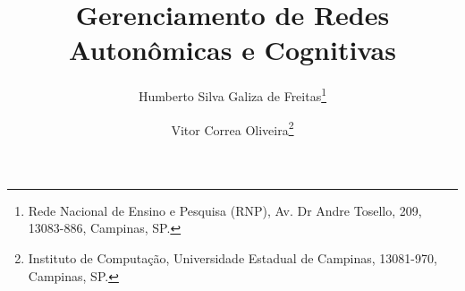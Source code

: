 \documentclass[11pt,twoside]{article}
\begin{document}
% 

%



\TRMakeCover


%
\pagestyle{myheadings}

%
\title{Gerenciamento de Redes Autonômicas e Cognitivas}

\author{Humberto Silva Galiza de Freitas\thanks{Rede Nacional de Ensino e Pesquisa (RNP), 
Av. Dr Andre Tosello, 209, 13083-886, Campinas, SP.} \and
Vitor Correa Oliveira\thanks{Instituto  de Computação, Universidade
Estadual  de Campinas, 13081-970, Campinas, SP. }}

\date{}

\maketitle

\end{document}
